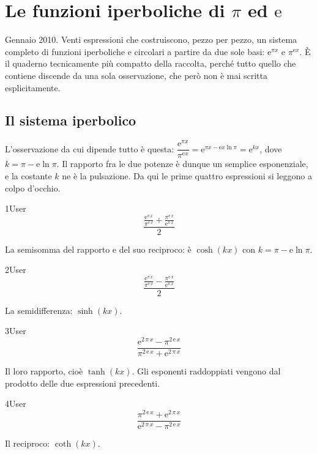 \chapter{Le funzioni iperboliche di $\pi$ ed $\mathrm{e}$}
\label{cap:sin-cos}

Gennaio 2010. Venti espressioni che costruiscono, pezzo per pezzo, un sistema completo di funzioni iperboliche e circolari a partire da due sole basi: $\mathrm{e}^{\pi x}$ e $\pi^{\mathrm{e}x}$. È il quaderno tecnicamente più compatto della raccolta, perché tutto quello che contiene discende da una sola osservazione, che però non è mai scritta esplicitamente.

\section{Il sistema iperbolico}

L'osservazione da cui dipende tutto è questa: $\dfrac{\mathrm{e}^{\pi x}}{\pi^{\mathrm{e}x}}=\mathrm{e}^{\pi x-\mathrm{e}x\ln\pi}=\mathrm{e}^{kx}$, dove $k=\pi-\mathrm{e}\ln\pi$. Il rapporto fra le due potenze è dunque un semplice esponenziale, e la costante $k$ ne è la pulsazione. Da qui le prime quattro espressioni si leggono a colpo d'occhio.

\begin{espr}{1}{User}{}
\[
\frac{\frac{\mathrm{e}^{\pi\, x}}{\pi^{\mathrm{e}\, x}} + \frac{\pi^{\mathrm{e}\, x}}{\mathrm{e}^{\pi\, x}}}{2}
\]
\end{espr}
La semisomma del rapporto e del suo reciproco: è $\cosh(kx)$ con $k=\pi-\mathrm{e}\ln\pi$.

\begin{espr}{2}{User}{}
\[
\frac{\frac{\mathrm{e}^{\pi\, x}}{\pi^{\mathrm{e}\, x}} - \frac{\pi^{\mathrm{e}\, x}}{\mathrm{e}^{\pi\, x}}}{2}
\]
\end{espr}
La semidifferenza: $\sinh(kx)$.

\begin{espr}{3}{User}{}
\[
\frac{\mathrm{e}^{2\, \pi\, x} - \pi^{2\, \mathrm{e}\, x}}{\pi^{2\, \mathrm{e}\, x} + \mathrm{e}^{2\, \pi\, x}}
\]
\end{espr}
Il loro rapporto, cioè $\tanh(kx)$. Gli esponenti raddoppiati vengono dal prodotto delle due espressioni precedenti.

\begin{espr}{4}{User}{}
\[
\frac{\pi^{2\, \mathrm{e}\, x} + \mathrm{e}^{2\, \pi\, x}}{\mathrm{e}^{2\, \pi\, x} - \pi^{2\, \mathrm{e}\, x}}
\]
\end{espr}
Il reciproco: $\coth(kx)$.


